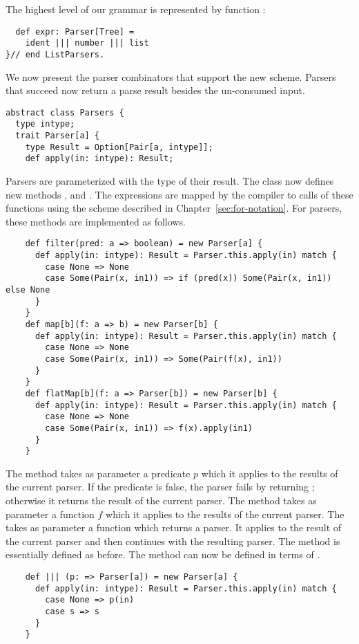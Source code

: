 {The highest level of our grammar is represented by function
:
\begin{lstlisting}
  def expr: Parser[Tree] = 
    ident ||| number ||| list
}// end ListParsers.
\end{lstlisting}
We now present the parser combinators that support the new
scheme. Parsers that succeed now return a parse result besides the
un-consumed input.
\begin{lstlisting}
abstract class Parsers {
  type intype;
  trait Parser[a] {
    type Result = Option[Pair[a, intype]];
    def apply(in: intype): Result;
\end{lstlisting}
Parsers are parameterized with the type of their result. The class
 now defines new methods , 
and . The  expressions are mapped by the
compiler to calls of these functions using the scheme described in
Chapter~\ref{sec:for-notation}. For parsers, these methods are
implemented as follows.
\begin{lstlisting}
    def filter(pred: a => boolean) = new Parser[a] {
      def apply(in: intype): Result = Parser.this.apply(in) match {
        case None => None
        case Some(Pair(x, in1)) => if (pred(x)) Some(Pair(x, in1)) else None
      }
    }
    def map[b](f: a => b) = new Parser[b] {
      def apply(in: intype): Result = Parser.this.apply(in) match {
        case None => None
        case Some(Pair(x, in1)) => Some(Pair(f(x), in1))
      }
    }
    def flatMap[b](f: a => Parser[b]) = new Parser[b] {
      def apply(in: intype): Result = Parser.this.apply(in) match {
        case None => None
        case Some(Pair(x, in1)) => f(x).apply(in1)
      }
    }
\end{lstlisting}
The  method takes as parameter a predicate $p$ which it
applies to the results of the current parser. If the predicate is
false, the parser fails by returning ; otherwise it returns
the result of the current parser.  The  method takes as
parameter a function $f$ which it applies to the results of the
current parser. The  takes as parameter a function
 which returns a parser.  It applies  to the result of
the current parser and then continues with the resulting parser.  The
\code{|||} method is essentially defined as before.  The
\code{&&&} method can now be defined in terms of .
\begin{lstlisting}
    def ||| (p: => Parser[a]) = new Parser[a] {
      def apply(in: intype): Result = Parser.this.apply(in) match {
        case None => p(in)
        case s => s
      }
    }


\end{lstlisting}}

